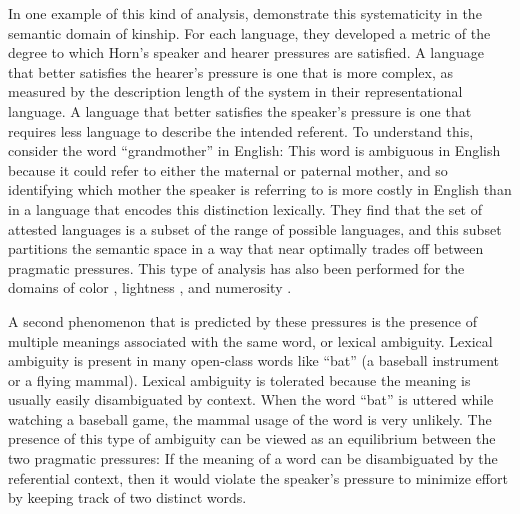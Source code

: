  In one example of this kind of analysis,  demonstrate this systematicity in the semantic domain of kinship. For each language, they developed a metric of the degree to which Horn's speaker and hearer pressures are satisfied. A language that better satisfies the hearer's pressure is one that is more complex, as measured by the description length of the system in their representational language. A language that better satisfies the speaker's pressure is one that requires less language to describe the intended referent. To understand this, consider the word ``grandmother'' in English: This word is ambiguous in English because it could refer to either the maternal or paternal mother, and so identifying which mother the speaker is referring to is more costly in English than in a language that encodes this distinction lexically. They find that the set of attested languages is a subset of the range of possible languages, and this subset partitions the semantic space in a way that near optimally trades off between pragmatic pressures. This type of analysis has also been performed for the domains of color \cite{regier2007color}, lightness \cite{baddeley2009}, and numerosity \cite{xu4numeral}.

A second phenomenon that is predicted by these pressures is the presence of multiple meanings associated with the same word, or lexical ambiguity. Lexical ambiguity is present in  many open-class words like ``bat'' (a baseball instrument or a flying mammal). Lexical ambiguity is tolerated because the meaning is usually easily disambiguated by context. When the word ``bat'' is uttered while watching a baseball game, the mammal usage of the word is very unlikely. The presence of this type of ambiguity can be viewed as an equilibrium between the two pragmatic pressures: If the meaning of a word can be disambiguated by the referential context, then it would violate the speaker's pressure to minimize effort by keeping track of two distinct words.

